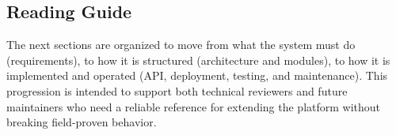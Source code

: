 \subsection{Reading Guide}
The next sections are organized to move from what the system must do (requirements), to how it is structured (architecture and modules), to how it is implemented and operated (API, deployment, testing, and maintenance). This progression is intended to support both technical reviewers and future maintainers who need a reliable reference for extending the platform without breaking field-proven behavior.

